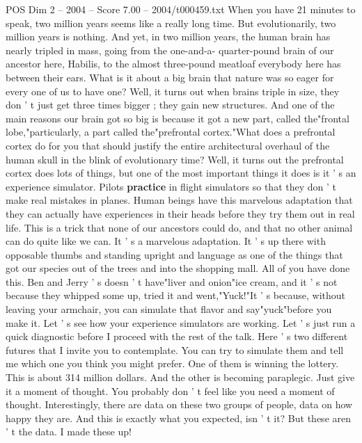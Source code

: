 \begin{textsample}{POS Dim 2 – 2004 – Score 7.00 – 2004/t000459.txt}  \label{ex:f2_pos_027}
When you have 21 minutes to speak, two million years seems like a really long time.
But evolutionarily, two million years is nothing.
And yet, in two million years, the human brain has nearly tripled in mass, going from the one-and-a- quarter-pound brain of our ancestor here, Habilis, to the almost three-pound meatloaf everybody here has between their ears.
What is it about a big brain that nature was so eager for every one of us to have one?
Well, it turns out when brains triple in size, they don ' t just get three times bigger ; they gain new structures.
And one of the main reasons our brain got so big is because it got a new part, called the"frontal lobe,"particularly, a part called the"prefrontal cortex."What does a prefrontal cortex do for you that should justify the entire architectural overhaul of the human skull in the blink of evolutionary time?
Well, it turns out the prefrontal cortex does lots of things, but one of the most important things it does is it ' s an experience simulator.
Pilots \textbf{practice} in flight simulators so that they don ' t make real mistakes in planes.
Human beings have this marvelous adaptation that they can actually have experiences in their heads before they try them out in real life.
This is a trick that none of our ancestors could do, and that no other animal can do quite like we can.
It ' s a marvelous adaptation.
It ' s up there with opposable thumbs and standing upright and language as one of the things that got our species out of the trees and into the shopping mall.
All of you have done this.
Ben and Jerry ' s doesn ' t have"liver and onion"ice cream, and it ' s not because they whipped some up, tried it and went,"Yuck!"It ' s because, without leaving your armchair, you can simulate that flavor and say"yuck"before you make it.
Let ' s see how your experience simulators are working.
Let ' s just run a quick diagnostic before I proceed with the rest of the talk.
Here ' s two different futures that I invite you to contemplate.
You can try to simulate them and tell me which one you think you might prefer.
One of them is winning the lottery.
This is about 314 million dollars.
And the other is becoming paraplegic.
Just give it a moment of thought.
You probably don ' t feel like you need a moment of thought.
Interestingly, there are data on these two groups of people, data on how happy they are.
And this is exactly what you expected, isn ' t it?
But these aren ' t the data.
I made these up!

\end{textsample}
